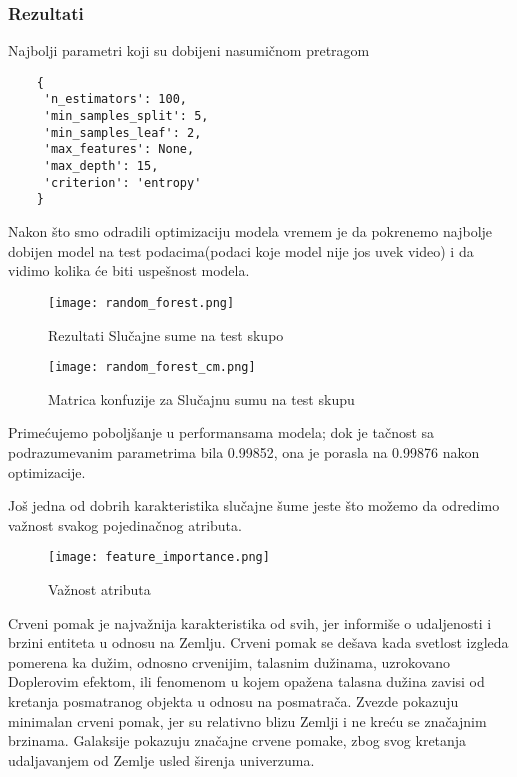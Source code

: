 \documentclass[a4paper,12pt]{article}
\begin{document}
\subsubsection{Rezultati}
Najbolji parametri koji su dobijeni nasumičnom pretragom
\begin{verbatim}
    {
     'n_estimators': 100,
     'min_samples_split': 5,
     'min_samples_leaf': 2,
     'max_features': None,
     'max_depth': 15,
     'criterion': 'entropy'
    }
\end{verbatim}

Nakon što smo odradili optimizaciju modela vremem je da pokrenemo najbolje dobijen model na test podacima(podaci koje model nije jos uvek video) i da vidimo kolika će biti uspešnost modela.

\begin{figure}
    \centering
    \texttt{[image: random\_forest.png]}
    \caption{Rezultati Slučajne sume na test skupo}
    \label{fig:random_forest}
\end{figure}

\begin{figure}
    \centering
    \texttt{[image: random\_forest\_cm.png]}
    \caption{Matrica konfuzije za Slučajnu sumu na test skupu}
    \label{fig:random_forest_cm}
\end{figure}

Primećujemo poboljšanje u performansama modela; dok je tačnost sa podrazumevanim parametrima bila 0.99852, ona je porasla na 0.99876 nakon optimizacije.

Još jedna od dobrih karakteristika slučajne šume jeste što možemo da odredimo važnost svakog pojedinačnog atributa.
\begin{figure}
    \centering
    \texttt{[image: feature\_importance.png]}
    \caption{Važnost atributa}
    \label{fig:feature_importance}
\end{figure}


Crveni pomak je najvažnija karakteristika od svih, jer informiše o udaljenosti i brzini entiteta u odnosu na Zemlju. Crveni pomak se dešava kada svetlost izgleda pomerena ka dužim, odnosno crvenijim, talasnim dužinama, uzrokovano Doplerovim efektom, ili fenomenom u kojem opažena talasna dužina zavisi od kretanja posmatranog objekta u odnosu na posmatrača.
Zvezde pokazuju minimalan crveni pomak, jer su relativno blizu Zemlji i ne kreću se značajnim brzinama. Galaksije pokazuju značajne crvene pomake, zbog svog kretanja udaljavanjem od Zemlje usled širenja univerzuma.
\end{document}

